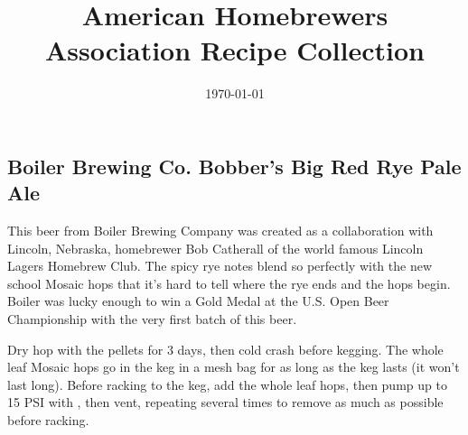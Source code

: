 \documentclass[10pt,oneside]{scrbook}
\begin{document}
\title{American Homebrewers Association Recipe Collection}
\date{\today}
\maketitle

\frontmatter

\tableofcontents

\mainmatter
\twocolumn

\part{\styleamericanale}

\chapter*{Boiler Brewing Co. Bobber's Big Red Rye Pale Ale}

\begin{aboutblock}
This beer from Boiler Brewing Company was created as a collaboration with Lincoln, Nebraska,
homebrewer Bob Catherall of the world famous Lincoln Lagers Homebrew Club. The spicy rye notes
blend so perfectly with the new school Mosaic hops that it's hard to tell where the rye ends
and the hops begin. Boiler was lucky enough to win a Gold Medal at the U.S. Open Beer Championship
with the very first batch of this beer.
\end{aboutblock}


\begin{methodandtiming}
 
\begin{mashsteps}
\end{mashsteps}

\begin{fermentationsteps}
\end{fermentationsteps}

\begin{directions}
Dry hop with the pellets for 3 days, then cold crash before kegging. The whole leaf Mosaic
hops go in the keg in a mesh bag for as long as the keg lasts (it won't last long). Before
racking to the keg, add the whole leaf hops, then pump up to 15 PSI with , then vent,
repeating several times to remove as much  as possible before racking.
\end{directions}

\end{methodandtiming}
\end{document}

